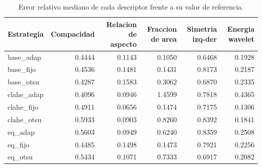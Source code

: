\begin{table}[H]
\centering
\small
\caption{Error relativo mediano de cada descriptor frente a su valor de referencia.}
\begin{tabular}{lrrrrr}
\toprule
\textbf{Estrategia} & \textbf{Compacidad} & \textbf{Relacion de aspecto} & \textbf{Fraccion de area} & \textbf{Simetria izq-der} & \textbf{Energia wavelet} \\
\midrule
base\_adap & 0.4444 & 0.1143 & 0.1050 & 0.6468 & 0.1928 \\
base\_fijo & 0.4536 & 0.1481 & 0.1431 & 0.8173 & 0.2187 \\
base\_otsu & 0.4287 & 0.1583 & 0.3062 & 0.6870 & 0.2335 \\
clahe\_adap & 0.4096 & 0.0946 & 1.4599 & 0.7818 & 0.4365 \\
clahe\_fijo & 0.4911 & 0.0656 & 0.1474 & 0.7175 & 0.1306 \\
clahe\_otsu & 0.5933 & 0.0903 & 0.8260 & 0.8392 & 0.1841 \\
eq\_adap & 0.5603 & 0.0949 & 0.6240 & 0.8359 & 0.2508 \\
eq\_fijo & 0.4485 & 0.1498 & 0.1473 & 0.7921 & 0.2256 \\
eq\_otsu & 0.5434 & 0.1071 & 0.7333 & 0.6917 & 0.2082 \\
\bottomrule
\end{tabular}
\end{table}
